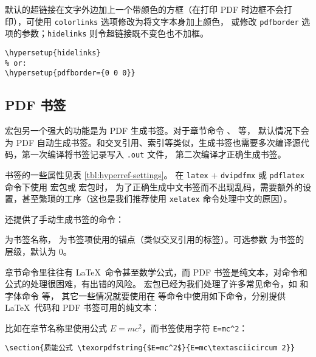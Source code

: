 默认的超链接在文字外边加上一个带颜色的方框（在打印 PDF 时边框不会打印），可使用 \texttt{color\-links} 选项修改为将文字本身加上颜色，
或修改 \texttt{pdf\-border} 选项的参数；\texttt{hide\-links} 则令超链接既不变色也不加框。
\begin{verbatim}
\hypersetup{hidelinks}
% or:
\hypersetup{pdfborder={0 0 0}}
\end{verbatim}

\subsection{PDF 书签}\label{subsec:pdf-bookmark}

 宏包另一个强大的功能是为 PDF 生成书签。对于章节命令 、 等，
默认情况下会为 PDF 自动生成书签。和交叉引用、索引等类似，生成书签也需要多次编译源代码，第一次编译将书签记录写入 \texttt{.out} 文件，
第二次编译才正确生成书签。

书签的一些属性见表 \ref{tbl:hyperref-settings}。
在 \texttt{latex} + \texttt{dvipdfmx} 或 \texttt{pdflatex} 命令下使用  宏包或  宏包时，
为了正确生成中文书签而不出现乱码，需要额外的设置，甚至繁琐的工序（这也是我们推荐使用 \texttt{xelatex} 命令处理中文的原因）。

 还提供了手动生成书签的命令：
\begin{command}
\end{command}
 为书签名称， 为书签项使用的锚点（类似交叉引用的标签）。可选参数  为书签的层级，默认为 0。

章节命令里往往有 \LaTeX\ 命令甚至数学公式，而 PDF 书签是纯文本，对命令和公式的处理很困难，有出错的风险。
 宏包已经为我们处理了许多常见命令，如  和字体命令  等，
其它一些情况就要使用在  等命令中使用如下命令，分别提供 \LaTeX\ 代码和 PDF 书签可用的纯文本：
\begin{command}
\end{command}
比如在章节名称里使用公式 $E=mc^2$，而书签使用字符 \texttt{E=mc\textasciicircum 2}：
\begin{verbatim}
\section{质能公式 \texorpdfstring{$E=mc^2$}{E=mc\textasciicircum 2}}
\end{verbatim}

